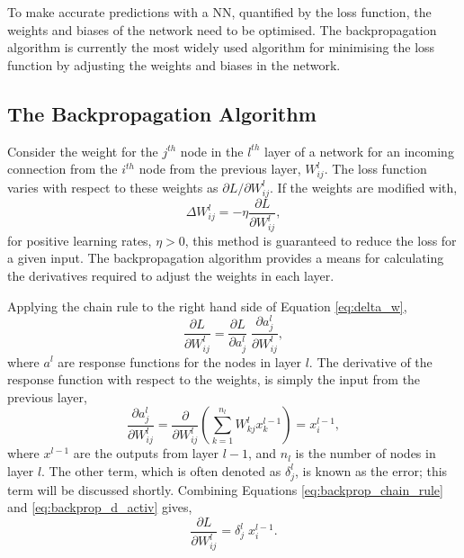 To make accurate predictions with a NN, quantified by the loss function, the
weights and biases of the network need to be optimised. The backpropagation
algorithm\cite{Rumelhart1986} is currently the most widely used algorithm for
minimising the loss function by adjusting the weights and biases in the network.

\subsection{The Backpropagation Algorithm}

Consider the weight for the $j^{th}$ node in the $l^{th}$ layer of a network for
an incoming connection from the $i^{th}$ node from the previous layer, 
$W^l_{ij}$. The loss function varies with respect to these weights as 
$\partial L/\partial W^l_{ ij }$. If the weights are modified with, 
\begin{equation} 
	\Delta W^l_{ ij } = -\eta \frac{\partial L}{\partial W^l_{ ij }},
	\label{eq:delta_w}
\end{equation}
for positive learning rates, $\eta > 0$, this method is guaranteed to reduce 
the loss for a given input. The backpropagation algorithm provides a means 
for calculating the derivatives required to adjust the weights in each layer.

Applying the chain rule to the right hand side of Equation \ref{eq:delta_w},
\begin{equation}
	\frac{\partial L}{\partial W^l_{ij}} = \frac{\partial L}{\partial a^l_j} \;
	\frac{\partial a^l_j}{\partial W^l_{ij}},
	\label{eq:backprop_chain_rule}
\end{equation}
where $a^l$ are response functions for the nodes in layer $l$. The derivative 
of the response function with respect to the weights, is simply the input from 
the previous layer,
\begin{equation}
	\frac{\partial a^l_j}{\partial W^l_{ij}} = \frac{\partial}{\partial W^l_{ij}}
	\left( \sum_{k = 1}^{n_l} W^l_{kj} x^{l-1}_{k} \right) = x^{l-1}_i,
	\label{eq:backprop_d_activ}
\end{equation}
where $x^{l-1}$ are the outputs from layer $l-1$, and $n_l$ is the number of 
nodes in layer $l$. The other term, which is often denoted as $\delta^l_j$, is 
known as the error; this term will be discussed shortly. Combining Equations 
\ref{eq:backprop_chain_rule} and \ref{eq:backprop_d_activ} gives,
\begin{equation*}
	\frac{\partial L}{\partial W^l_{ij}} = \delta^l_j \; x^{l-1}_i.
\end{equation*}

